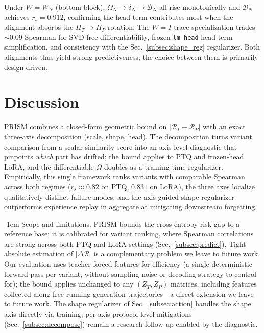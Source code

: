 \documentclass{article}
\makeatletter
\newlength{\paraSpace}
\renewcommand{\paragraph}{\@startsection{paragraph}{4}{\z@}%
  {\paraSpace}{-1em}%
  {\normalfont\normalsize\bfseries}}
\makeatother
\begin{document}
Under $W{=}W_N$ (bottom block), $\Omega_N \to \delta_N \to \mathcal{B}_N$ all rise monotonically and $\mathcal{B}_N$ achieves $r_s{=}0.912$, confirming the head term contributes most when the alignment absorbs the $H_T \to H_P$ rotation. The $W{=}I$ trace specialization trades $\sim$$0.09$ Spearman for SVD-free differentiability, frozen-\texttt{lm\_head} head-term simplification, and consistency with the Sec.~\ref{subsec:shape_reg} regularizer. Both alignments thus yield strong predictiveness; the choice between them is primarily design-driven.


\section{Discussion}
\label{sec:conclusion}

PRISM combines a closed-form geometric bound on $|\mathcal{R}_T{-}\mathcal{R}_P|$ with an exact three-axis decomposition (scale, shape, head). The decomposition turns variant comparison from a scalar similarity score into an axis-level diagnostic that pinpoints \emph{which} part has drifted; the bound applies to PTQ and frozen-head LoRA, and the differentiable $\Omega$ doubles as a training-time regularizer. Empirically, this single framework ranks variants with comparable Spearman across both regimes ($r_s{\approx}0.82$ on PTQ, $0.831$ on LoRA), the three axes localize qualitatively distinct failure modes, and the axis-guided shape regularizer outperforms experience replay in aggregate at mitigating downstream forgetting.

\paragraph{Scope and limitations.}
PRISM bounds the cross-entropy risk gap to a reference base; it is calibrated for variant ranking, where Spearman correlations are strong across both PTQ and LoRA settings (Sec.~\ref{subsec:predict}). Tight absolute estimation of $|\Delta\mathcal{R}|$ is a complementary problem we leave to future work. Our evaluation uses teacher-forced features for efficiency (a single deterministic forward pass per variant, without sampling noise or decoding strategy to control for); the bound applies unchanged to any $(Z_T, Z_P)$ matrices, including features collected along free-running generation trajectories---a direct extension we leave to future work. The shape regularizer of Sec.~\ref{subsec:action} handles the shape axis directly via training; per-axis protocol-level mitigations (Sec.~\ref{subsec:decompose}) remain a research follow-up enabled by the diagnostic.
\end{document}
